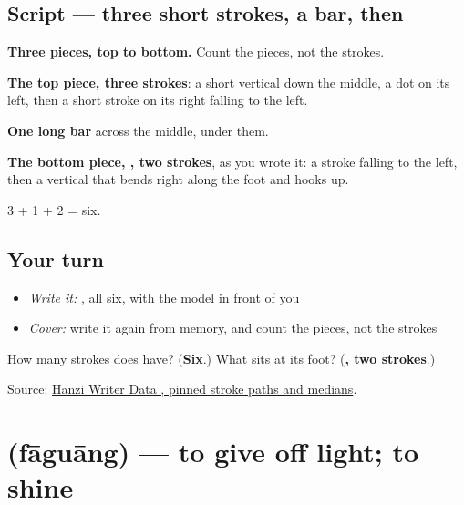 \subsection*{Script — three short strokes, a bar, then }

\begin{quote}
\end{quote}

\textbf{Three pieces, top to bottom.} Count the pieces, not the strokes.

\textbf{The top piece, three strokes}: a short vertical down the middle, a dot on its left, then a short stroke on its right falling to the left.

\textbf{One long bar} across the middle, under them.

\textbf{The bottom piece, , two strokes}, as you wrote it: a stroke falling to the left, then a vertical that bends right along the foot and hooks up.

3 + 1 + 2 = six.

\subsection*{Your turn}
\begin{itemize}
\raggedright
  \item \emph{Write it:} , all six, with the model in front of you
  \item \emph{Cover:} write it again from memory, and count the pieces, not the strokes
\end{itemize}

\begin{tcolorbox}[breakable,colback=teal!4,colframe=teal!35!black,title={Before you move on}]
How many strokes does  have? (\textbf{Six}.) What sits at its foot? (\textbf{, two strokes}.)

Source: \href{https://raw.githubusercontent.com/chanind/hanzi-writer-data/68d10a4b21150cae5e1ebbd223eed289cf32d90c/data/\%E5\%85\%89.json}{Hanzi Writer Data , pinned stroke paths and medians}.
\end{tcolorbox}
\section[\texorpdfstring{\zh{发光} (fāguāng)}{发光 (fāguāng)}]{ (fāguāng) — to give off light; to shine}

